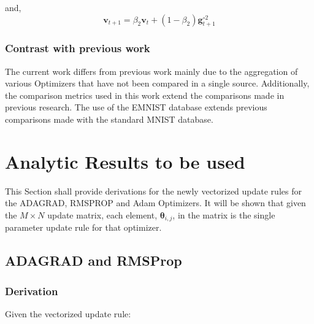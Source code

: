 \documentclass{article}
\begin{document}
and,
\begin{equation}
\boldsymbol{v}_{t+1} = \beta_2\boldsymbol{v}_{t} + (1-\beta_2)\boldsymbol{g}_{t+1}^{\circ2}
\end{equation}
\subsubsection{Contrast with previous work}

The current work differs from previous work mainly due to the aggregation of various Optimizers that have not been compared in a single source. Additionally, the comparison metrics used in this work extend the comparisons made in previous research. The use of the EMNIST database extends previous comparisons made with the standard MNIST database.

\section{Analytic Results to be used}
This Section shall provide derivations for the newly vectorized update rules for the ADAGRAD, RMSPROP and Adam Optimizers. It will be shown that given the $M \times N$ update matrix, each element, $\boldsymbol{\theta}_{i,j}$,  in the matrix is the single parameter update rule for that optimizer.

\subsection{ADAGRAD and RMSProp}
\subsubsection{Derivation}
Given the vectorized update rule: \hfill\newline
\end{document}
